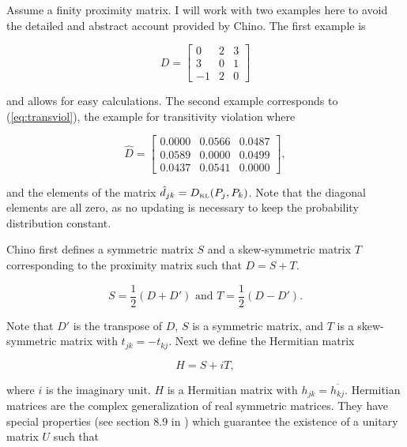\documentclass[11pt]{article}
\begin{document}
Assume a finity proximity matrix. I will work with two examples here
to avoid the detailed and abstract account provided by Chino. The
first example is

\begin{equation}
  \label{eq:simpromat}
D=\left[
      \begin{array}{ccc}
        0 & 2 & 3 \\
        3 & 0 & 1 \\
        -1 & 2 & 0 
      \end{array}
\right]
\end{equation}

and allows for easy calculations. The second example corresponds to
(\ref{eq:transviol}), the example for transitivity violation where

\begin{equation}
  \label{eq:dklpromat}
\hat{D}=\left[
      \begin{array}{ccc}
0.0000 &  0.0566 &  0.0487 \\
0.0589 &  0.0000 &  0.0499 \\
0.0437 &  0.0541 &  0.0000
      \end{array}
\right],
\end{equation}

and the elements of the matrix $\hat{d}_{jk}=D_{\mbox{\tiny KL}}(P_{j},P_{k})$.
Note that the diagonal elements are all zero, as no updating is
necessary to keep the probability distribution constant.

Chino first defines a symmetric matrix $S$ and a skew-symmetric matrix
$T$ corresponding to the proximity matrix such that $D=S+T$.

\begin{equation}
  \label{eq:skewsym}
  S=\frac{1}{2}(D+D')\mbox{ and }T=\frac{1}{2}(D-D').
\end{equation}

Note that $D'$ is the transpose of $D$, $S$ is a symmetric matrix, and
$T$ is a skew-symmetric matrix with $t_{jk}=-t_{kj}$. Next we define
the Hermitian matrix

\begin{equation}
  \label{eq:herm}
  H=S+iT,
\end{equation}

where $i$ is the imaginary unit. $H$ is a Hermitian matrix with
$h_{jk}=\overline{h_{kj}}$. Hermitian matrices are the complex
generalization of real symmetric matrices. They have special
properties (see section 8.9 in ) which
guarantee the existence of a unitary matrix $U$ such that
\end{document}
